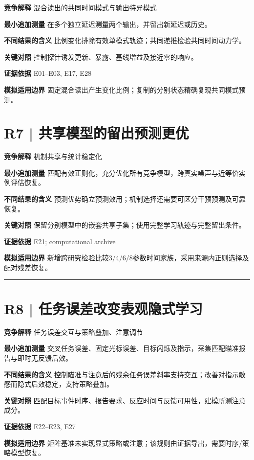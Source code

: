 \documentclass[11pt,a4paper]{article}
\begin{document}
\medskip\textbf{竞争解释} 混合读出的共同时间模式与输出特异模式\par
\medskip\textbf{最小追加测量} 在多个独立延迟测量两个输出，并留出新延迟或历史。\par
\medskip\textbf{不同结果的含义} 比例变化排除有效单模式轨迹；共同递推检验共同时间动力学。\par
\medskip\textbf{关键对照} 控制探针诱发更新、暴露、基线增益及接近零的响应。\par
\medskip\textbf{证据依据} E01--E03, E17, E28\par
\medskip\textbf{模拟适用边界} 固定混合读出产生变化比例；复制的分别状态精确复现共同模式预测。\par
\clearpage\section{R7 | 共享模型的留出预测更优}
\medskip\textbf{竞争解释} 机制共享与统计稳定化\par
\medskip\textbf{最小追加测量} 匹配有效正则化，充分优化所有竞争模型，跨真实噪声与近等价实例评估恢复。\par
\medskip\textbf{不同结果的含义} 预测优势确立预测效用；机制选择还需要可区分干预预测及可靠恢复。\par
\medskip\textbf{关键对照} 保留分别模型中的嵌套共享子集；使用完整学习轨迹与完整留出条件。\par
\medskip\textbf{证据依据} E21; computational archive\par
\medskip\textbf{模拟适用边界} 新增跨研究检验比较3/4/6/8参数时间家族，采用来源内正则选择及配对残差恢复。\par
\bigskip\hrule\medskip\section{R8 | 任务误差改变表观隐式学习}
\medskip\textbf{竞争解释} 任务误差交互与策略叠加、注意调节\par
\medskip\textbf{最小追加测量} 交叉任务误差、固定光标误差、目标闪烁及指示，采集匹配瞄准报告与即时无反馈后效。\par
\medskip\textbf{不同结果的含义} 控制瞄准与注意后的残余任务误差斜率支持交互；改善对指示敏感而隐式后效稳定，支持策略叠加。\par
\medskip\textbf{关键对照} 匹配目标事件时序、报告要求、反应时间与反馈可用性，建模所测注意成分。\par
\medskip\textbf{证据依据} E22--E23, E27\par
\medskip\textbf{模拟适用边界} 矩阵基准未实现显式策略或注意；该规则由证据导出，需要时序/策略模型恢复。\par
\end{document}
